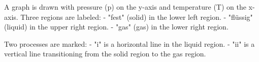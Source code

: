 A graph is drawn with pressure (p) on the y-axis and temperature (T) on the x-axis. Three regions are labeled:  
- "fest" (solid) in the lower left region.  
- "flüssig" (liquid) in the upper right region.  
- "gas" (gas) in the lower right region.  

Two processes are marked:  
- "i" is a horizontal line in the liquid region.  
- "ii" is a vertical line transitioning from the solid region to the gas region.